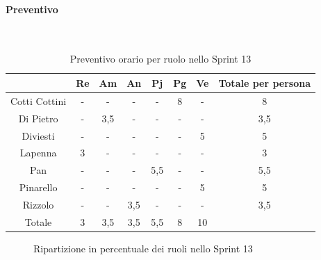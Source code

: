 \documentclass{article}
\begin{document}
                \paragraph{Preventivo}\mbox{}\\
                \begin{table}[H]
                    \centering
                    \begin{tabular}{|c|c|c|c|c|c|c|c|}
                    \hline
                                  & Re  & Am  & An  & Pj  & Pg  & Ve  & Totale per persona \\ \hline
                    Cotti Cottini & -   & -   & -   & -   & 8  & -   & 8                 \\ \hline
                    Di Pietro     & -   & 3,5 & -   & -   & -   & -   & 3,5                \\ \hline
                    Diviesti      & -   & -   & -   & -   & -   & 5   & 5                  \\ \hline
                    Lapenna       & 3   & -   & -   & -   & -   & -   & 3                  \\ \hline
                    Pan           & -   & -   & -   & 5,5 & -   & -   & 5,5                \\ \hline
                    Pinarello     & -   & -   & -   & -   & -   & 5   & 5                  \\ \hline
                    Rizzolo       & -   & -   & 3,5 & -   & -   & -   & 3,5                \\ \hline
                    Totale        & 3   & 3,5 & 3,5 & 5,5 & 8  & 10  &                    \\ \hline
                    \end{tabular}
                    \caption{Preventivo orario per ruolo nello Sprint 13}
                \end{table}


                \begin{figure}[H]
                    \centering
                    \caption{Ripartizione in percentuale dei ruoli nello Sprint 13}
                \end{figure}


\end{document}
